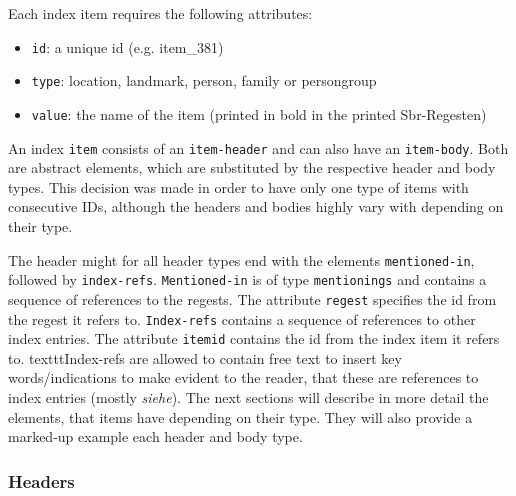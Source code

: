 Each index item requires the following attributes: 
\begin{itemize}
\item \texttt{id}: a unique id (e.g. item\_381)
\item \texttt{type}: location, landmark, person, family or persongroup
\item \texttt{value}: the name of the item (printed in bold in the printed Sbr-Regesten)
\end{itemize}


An index \texttt{item} consists of an \texttt{item-header} and can also have an \texttt{item-body}. Both are abstract elements, which are substituted by the respective header and body types. This decision was made in order to have only one type of items with consecutive IDs, although the headers and bodies highly vary with depending on their type.


The header might for all header types end with the elements \texttt{mentioned-in}, followed by \texttt{index-refs}. \texttt{Mentioned-in} is of type \texttt{mentionings} and contains a sequence of references to the regests. The attribute \texttt{regest} specifies the id from the regest it refers to. \texttt{Index-refs} contains  a sequence of references to other index entries. The attribute \texttt{itemid} contains the id from the index item it refers to. texttt{Index-refs} are allowed to contain free text to insert key words/indications to make evident to the reader, that these are references to index entries (mostly \textit{siehe}).
The next sections will describe in more detail the elements, that items have depending on their type. They will also provide a marked-up example each header and body type.

\subsubsection{Headers}

